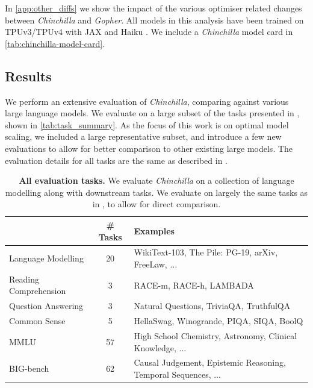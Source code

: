 \documentclass[11pt, a4paper, logo, copyright, nonumbering]{deepmind}
\newcommand{\gopher}{\textit{Gopher}\xspace}
\newcommand{\chinchilla}{\textit{Chinchilla}\xspace}
\newcommand{\bigbench}{BIG-bench\xspace}
\begin{document}
In \autoref{app:other_diffs} we show the impact of the various optimiser related changes between \chinchilla and \gopher.
All models in this analysis have been trained on TPUv3/TPUv4 \citep{10.1145/3079856.3080246} with JAX \citep{jax2018github} and Haiku \citep{haiku2020github}.
We include a \chinchilla model card \citep{mitchell2019model} in \autoref{tab:chinchilla-model-card}.

\subsection{Results}
\label{sec:model_analysis}
We perform an extensive evaluation of \chinchilla, comparing against various large language models. 
We evaluate on a large subset of the tasks presented in \citet{rae2021gopher}, shown in \autoref{tab:task_summary}.
As the focus of this work is on optimal model scaling, we included a large representative subset, and introduce a few new evaluations to allow for better comparison to other existing large models. 
The evaluation details for all tasks are the same as described in \citet{rae2021gopher}.

\begin{table}
    \centering
    \begin{tabular}{l c l}
    \toprule
        & \# Tasks & Examples \\
    \midrule
    Language Modelling & 20  & {\small WikiText-103, The Pile: PG-19, arXiv, FreeLaw, $\ldots$} \\ 
    Reading Comprehension & 3 & {\small RACE-m, RACE-h, LAMBADA} \\
    Question Answering & 3 & {\small Natural Questions, TriviaQA, TruthfulQA} \\
    Common Sense & 5 & {\small HellaSwag, Winogrande, PIQA, SIQA, BoolQ} \\
    MMLU & 57 & {\small High School Chemistry, Astronomy, Clinical Knowledge, $\ldots$} \\
    \bigbench & 62 & {\small Causal Judgement, Epistemic Reasoning, Temporal Sequences, $\ldots$}  \\
    \bottomrule
    \end{tabular}
    \caption{\textbf{All evaluation tasks.} We evaluate \chinchilla on a collection of language modelling along with downstream tasks. We evaluate on largely the same tasks as in \citet{rae2021gopher}, to allow for direct comparison.}
    \label{tab:task_summary}
\end{table}
\end{document}

